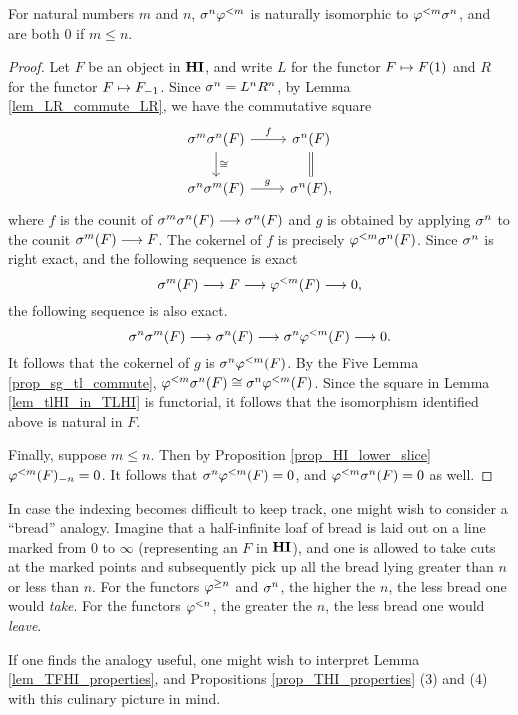 \begin{prop}\label{prop_sg_tl_commute}
For natural numbers $m$ and $n$, $\sgHI{n} \tlHI{m}$ is naturally
isomorphic to $\tlHI{m} \sgHI{n}$, and are both 0 if $m \leq n$.
\end{prop}
\begin{proof}
Let $F$ be an object in $\HI$, and write $L$ for the functor
$F \mapsto \LHI{F}$ and $R$ for the functor $F \mapsto \RHI{F}$.
Since $\sgHI{n} = L^nR^n$, by Lemma \ref{lem_LR_commute_LR}, 
we have the commutative square
\begin{equation}\label{eq_prop_sg_tl_com_sq}
\begin{tikzcd}
\sgHI{m}\sgHI{n}(F) \arrow{r}{f} \arrow{d}{\cong} & 
\sgHI{n}(F) \arrow[equal]{d} \\
\sgHI{n}\sgHI{m}(F) \arrow{r}{g} &
\sgHI{n}(F),
\end{tikzcd}
\end{equation}
where $f$ is the counit of $\sgHI{m}\sgHI{n}(F) \to \sgHI{n}(F)$ and 
$g$ is obtained by applying $\sgHI{n}$ to the counit $\sgHI{m}(F) 
\to F$. The cokernel of $f$ is precisely $\tlHI{m} \sgHI{n}(F)$.
Since $\sgHI{n}$ is right exact, and the
following sequence is exact
\[
\sgHI{m}(F) \to F \to \tlHI{m}(F) \to 0,
\]
the following sequence is also exact.
\[
\sgHI{n} \sgHI{m}(F) \to \sgHI{n}(F) \to \sgHI{n} \tlHI{m}(F) 
   \to 0.
\]
It follows that the cokernel of $g$ is $\sgHI{n} \tlHI{m}(F)$.  By the
Five Lemma \ref{prop_sg_tl_commute}, $\tlHI{m} \sgHI{n}(F) \cong
\sgHI{n} \tlHI{m}(F)$. Since the square in Lemma
\ref{lem_tlHI_in_TLHI} is functorial, it follows that the isomorphism
identified above is natural in $F$.

Finally, suppose $m \leq n$. Then by Proposition 
\ref{prop_HI_lower_slice} $\RHI[n]{\tlHI{m}(F)} = 0$. It follows 
that $\sgHI{n} \tlHI{m}(F) = 0$, and $\tlHI{m} \sgHI{n}(F) = 0$ as 
well.
\end{proof}

\begin{rmk}
  In case the indexing becomes difficult to keep track, one might wish
  to consider a ``bread'' analogy. Imagine that a half-infinite loaf
  of bread is laid out on a line marked from 0 to $\infty$
  (representing an $F$ in $\HI$), and one is allowed to take cuts at
  the marked points and subsequently pick up all the bread lying
  greater than $n$ or less than $n$. For the functors $\tgHI{n}$ and
  $\sgHI{n}$, the higher the $n$, the less bread one would
  \emph{take}. For the functors $\tlHI{n}$, the greater the $n$, the
  less bread one would \emph{leave}.

If one finds the analogy useful, one might wish to interpret
Lemma \ref{lem_TFHI_properties}, and Propositions
\ref{prop_THI_properties} (3) and (4) with this culinary picture 
in mind.
\end{rmk}

